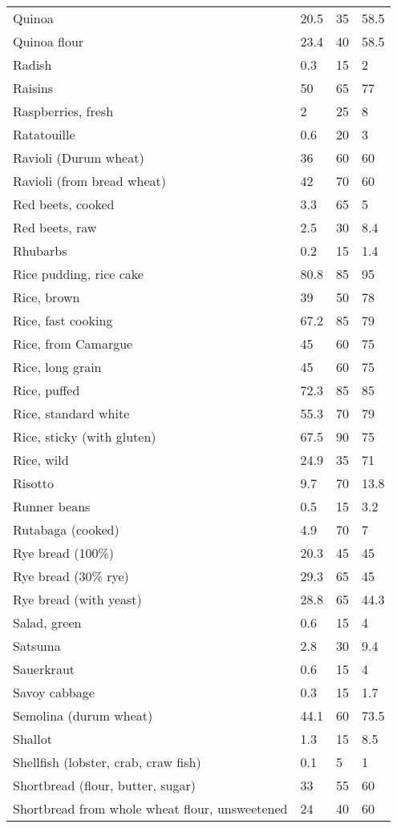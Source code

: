 \documentclass[../main.tex]{subfiles}
\begin{document}
\begin{longtable}{llll}
Quinoa & 20.5 & 35 & 58.5 \\
Quinoa flour & 23.4 & 40 & 58.5 \\
Radish & 0.3 & 15 & 2 \\
Raisins & 50 & 65 & 77 \\
Raspberries, fresh & 2 & 25 & 8 \\
Ratatouille & 0.6 & 20 & 3 \\
Ravioli (Durum wheat) & 36 & 60 & 60 \\
Ravioli (from bread wheat) & 42 & 70 & 60 \\
Red beets, cooked & 3.3 & 65 & 5 \\
Red beets, raw & 2.5 & 30 & 8.4 \\
Rhubarbs & 0.2 & 15 & 1.4 \\
Rice pudding, rice cake & 80.8 & 85 & 95 \\
Rice, brown & 39 & 50 & 78 \\
Rice, fast cooking & 67.2 & 85 & 79 \\
Rice, from Camargue & 45 & 60 & 75 \\
Rice, long grain & 45 & 60 & 75 \\
Rice, puffed & 72.3 & 85 & 85 \\
Rice, standard white & 55.3 & 70 & 79 \\
Rice, sticky (with gluten) & 67.5 & 90 & 75 \\
Rice, wild & 24.9 & 35 & 71 \\
Risotto & 9.7 & 70 & 13.8 \\
Runner beans & 0.5 & 15 & 3.2 \\
Rutabaga (cooked) & 4.9 & 70 & 7 \\
Rye bread (100\%) & 20.3 & 45 & 45 \\
Rye bread (30\% rye) & 29.3 & 65 & 45 \\
Rye bread (with yeast) & 28.8 & 65 & 44.3 \\
Salad, green & 0.6 & 15 & 4 \\
Satsuma & 2.8 & 30 & 9.4 \\
Sauerkraut & 0.6 & 15 & 4 \\
Savoy cabbage & 0.3 & 15 & 1.7 \\
Semolina (durum wheat) & 44.1 & 60 & 73.5 \\
Shallot & 1.3 & 15 & 8.5 \\
Shellfish (lobster, crab, craw fish) & 0.1 & 5 & 1 \\
Shortbread (flour, butter, sugar) & 33 & 55 & 60 \\
Shortbread from whole wheat flour, unsweetened & 24 & 40 & 60 \\

\end{longtable}
\end{document}
